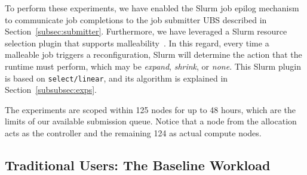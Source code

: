 \documentclass[a4paper,fleqn]{cas-dc}
\newcommand{\blindtext}[1]{\textbf{$<<$Text hidden for blind review$>>$}}
\newcommand{\sergio}[1]{\textcolor{black}{#1}}
\begin{document}
To perform these experiments, we have enabled the Slurm job epilog mechanism to communicate job completions to the job submitter UBS described in Section~\ref{subsec:submitter}.
Furthermore, we have leveraged a Slurm resource selection plugin that supports malleability~\cite{iserte_dmrlib_2020}. 
In this regard, every time a malleable job triggers a reconfiguration, Slurm will determine the action that the runtime must perform, which may be \textit{expand}, \textit{shrink}, or \textit{none}. This Slurm plugin is based on \texttt{select/linear}, and its algorithm is explained in Section~\ref{subsubsec:exps}.

The experiments are scoped within 125 nodes for up to 48 hours, which are the limits of our available submission queue. %
Notice that a node from the allocation acts as the controller and the remaining 124 as actual compute nodes.

\subsection{Traditional Users: The Baseline Workload}
\end{document}
